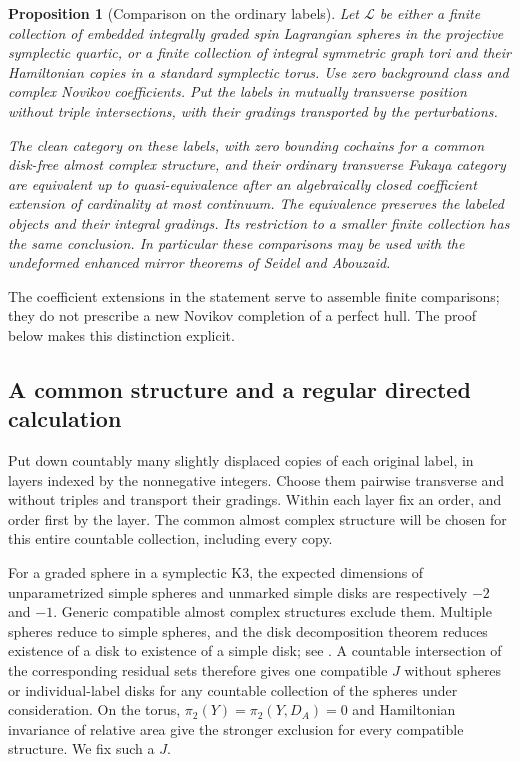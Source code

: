 \documentclass[11pt]{article}
\numberwithin{equation}{section}
\newtheorem{proposition}[theorem]{Proposition}
\theoremstyle{definition}
\theoremstyle{remark}
\begin{document}
\begin{proposition}[Comparison on the ordinary labels]
\label{prop:category-comparison}
Let $\mathcal L$ be either a finite collection of embedded integrally
graded spin Lagrangian spheres in the projective symplectic quartic,
or a finite collection of integral symmetric graph tori and their
Hamiltonian copies in a standard symplectic torus.  Use zero background
class and complex Novikov coefficients.  Put the labels in mutually
transverse position without triple intersections, with their gradings
transported by the perturbations.

The clean category on these labels, with zero bounding cochains for
a common disk-free almost complex structure, and their ordinary
transverse Fukaya category are equivalent up to quasi-equivalence
after an algebraically closed coefficient extension of cardinality
at most continuum.  The equivalence preserves the labeled objects
and their integral gradings.  Its restriction to a smaller finite
collection has the same conclusion.  In particular these comparisons
may be used with the undeformed enhanced mirror theorems of Seidel
and Abouzaid.
\end{proposition}

The coefficient extensions in the statement serve to assemble finite
comparisons; they do not prescribe a new Novikov completion of a perfect
hull.  The proof below makes this distinction explicit.

\subsection{A common structure and a regular directed calculation}

Put down countably many slightly displaced copies of each original
label, in layers indexed by the nonnegative integers.  Choose them
pairwise transverse and without triples and transport their gradings.
Within each layer fix an order, and order first by the layer.  The
common almost complex structure will be chosen for this entire
countable collection, including every copy.

For a graded sphere in a symplectic K3, the expected dimensions of
unparametrized simple spheres and unmarked simple disks are respectively
$-2$ and $-1$.  Generic compatible almost complex structures exclude
them.  Multiple spheres reduce to simple spheres, and the disk
decomposition theorem reduces existence of a disk to existence of a
simple disk; see \cite[Lemma~8.4]{HMS:SeidelQuartic}.  A countable
intersection of the corresponding residual sets therefore gives one
compatible $J$ without spheres or individual-label disks for any
countable collection of the spheres under consideration.  On the torus,
$\pi_2(Y)=\pi_2(Y,D_A)=0$ and Hamiltonian invariance of relative area
give the stronger exclusion for every compatible structure.  We fix
such a $J$.
\end{document}
